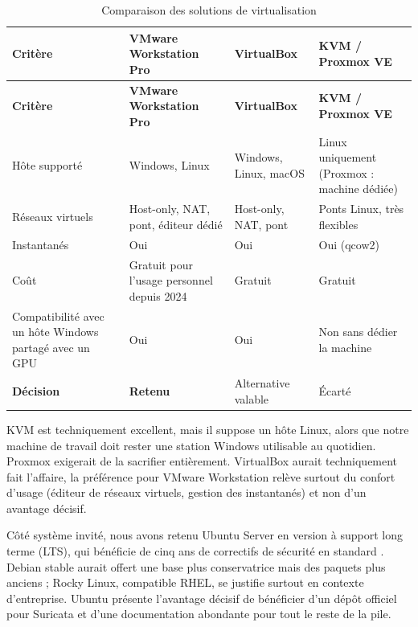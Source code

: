 \renewcommand{\arraystretch}{1.25}
\small
\begin{xltabular}{\textwidth}{|>{\raggedright\arraybackslash}X|>{\raggedright\arraybackslash}X|>{\raggedright\arraybackslash}X|>{\raggedright\arraybackslash}X|}

\caption{Comparaison des solutions de virtualisation}
\label{tab:virt} \\

\hline
{}
\textbf{Critère} & \textbf{VMware Workstation Pro} \cite{vmware_workstation} & \textbf{VirtualBox} \cite{virtualbox} & \textbf{KVM / Proxmox VE} \cite{kivity2007kvm,proxmox_docs} \\ \hline
\endfirsthead

\hline
{}
\textbf{Critère} & \textbf{VMware Workstation Pro} \cite{vmware_workstation} & \textbf{VirtualBox} \cite{virtualbox} & \textbf{KVM / Proxmox VE} \cite{kivity2007kvm,proxmox_docs} \\ \hline
\endhead

Hôte supporté & Windows, Linux & Windows, Linux, macOS & Linux uniquement (Proxmox : machine dédiée) \\ \hline
Réseaux virtuels & Host-only, NAT, pont, éditeur dédié & Host-only, NAT, pont & Ponts Linux, très flexibles \\ \hline
Instantanés & Oui & Oui & Oui (qcow2) \\ \hline
Coût & Gratuit pour l'usage personnel depuis 2024 & Gratuit & Gratuit \\ \hline
Compatibilité avec un hôte Windows partagé avec un GPU & Oui & Oui & Non sans dédier la machine \\ \hline
\textbf{Décision} & \textbf{Retenu} & Alternative valable & Écarté \\ \hline

\end{xltabular}
KVM est techniquement excellent, mais il suppose un hôte Linux, alors que notre machine de travail doit rester une station Windows utilisable au quotidien. Proxmox exigerait de la sacrifier entièrement. VirtualBox aurait techniquement fait l'affaire, la préférence pour VMware Workstation relève surtout du confort d'usage (éditeur de réseaux virtuels, gestion des instantanés) et non d'un avantage décisif.

Côté système invité, nous avons retenu Ubuntu Server en version à support long terme (LTS), qui bénéficie de cinq ans de correctifs de sécurité en standard \cite{ubuntu_lifecycle}. Debian stable aurait offert une base plus conservatrice mais des paquets plus anciens ; Rocky Linux, compatible RHEL, se justifie surtout en contexte d'entreprise. Ubuntu présente l'avantage décisif de bénéficier d'un dépôt officiel pour Suricata et d'une documentation abondante pour tout le reste de la pile.

